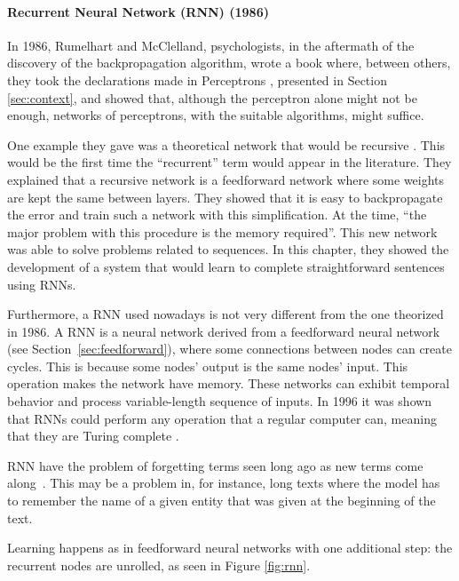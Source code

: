 \paragraph{Recurrent Neural Network (RNN) (1986)} \label{sec:rnn}

In 1986, Rumelhart and McClelland, psychologists, in the aftermath of the discovery of the backpropagation algorithm, wrote a book \cite{rumelhart_parallel_1986} where, between others, they took the declarations made in Perceptrons \cite{marvin_minsky_perceptrons_1969}, presented in Section \ref{sec:context}, and showed that, although the perceptron alone might not be enough, networks of perceptrons, with the suitable algorithms, might suffice.

One example they gave was a theoretical network that would be recursive \cite{rumelhart_learning_1987}. This would be the first time the ``recurrent'' term would appear in the literature. They explained that a recursive network is a feedforward network where some weights are kept the same between layers. They showed that it is easy to backpropagate the error and train such a network with this simplification. At the time, ``the major problem with this procedure is the memory required''. This new network was able to solve problems related to sequences. In this chapter, they showed the development of a system that would learn to complete straightforward sentences using \aclp{RNN}.

Furthermore, a \ac{RNN} used nowadays is not very different from the one theorized in 1986. A \ac{RNN} is a neural network derived from a feedforward neural network (see Section~\ref{sec:feedforward}), where some connections between nodes can create cycles. This is because some nodes' output is the same nodes' input. This operation makes the network have memory. These networks can exhibit temporal behavior and process variable-length sequence of inputs. In 1996 it was shown that \acp{RNN} could perform any operation that a regular computer can, meaning that they are Turing complete \cite{hyotyniemi_turing_1996}.

\Ac{RNN} have the problem of forgetting terms seen long ago as new terms come along~\cite{hochreiter_long_1997}. This may be a problem in, for instance, long texts where the model has to remember the name of a given entity that was given at the beginning of the text.

Learning happens as in feedforward neural networks with one additional step: the recurrent nodes are unrolled, as seen in Figure \ref{fig:rnn}.

